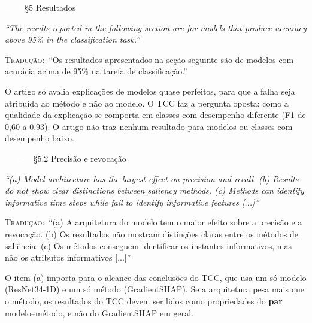 \documentclass[11pt,a4paper]{article}
\newcommand{\pagechip}[1]{{\setlength{\fboxsep}{1.5pt}\colorbox{cAcc}{\textcolor{white}{\scriptsize\texttt{#1}}}}}
\newenvironment{origquote}{\par\itshape\small}{\par}
\newenvironment{tradquote}{\par\small\textsc{Tradução:}\ }{\par}
\newcommand{\explab}[1]{\par\smallskip{\small\color{cAcc}\textbf{\MakeUppercase{#1}}}\par}
\begin{document}
\begin{citacard}{\pagechip{p. 5} §5 Resultados}
\begin{origquote}“The results reported in the following section are for models that produce accuracy above 95\% in the classification task.”\end{origquote}
\begin{tradquote}“Os resultados apresentados na seção seguinte são de modelos com acurácia acima de 95\% na tarefa de classificação.”\end{tradquote}
\explab{Explicação}
O artigo só avalia explicações de modelos quase perfeitos, para que a falha seja atribuída ao método e não ao modelo. O TCC faz a pergunta oposta: como a qualidade da explicação se comporta em classes com desempenho diferente (F1 de 0,60 a 0,93). O artigo não traz nenhum resultado para modelos ou classes com desempenho baixo.
\end{citacard}

\begin{citacard}{\pagechip{p. 6--7} §5.2 Precisão e revocação}
\begin{origquote}“(a) Model architecture has the largest effect on precision and recall. (b) Results do not show clear distinctions between saliency methods. (c) Methods can identify informative time steps while fail to identify informative features [...]”\end{origquote}
\begin{tradquote}“(a) A arquitetura do modelo tem o maior efeito sobre a precisão e a revocação. (b) Os resultados não mostram distinções claras entre os métodos de saliência. (c) Os métodos conseguem identificar os instantes informativos, mas não os atributos informativos [...]”\end{tradquote}
\explab{Explicação}
O item (a) importa para o alcance das conclusões do TCC, que usa um só modelo (ResNet34-1D) e um só método (GradientSHAP). Se a arquitetura pesa mais que o método, os resultados do TCC devem ser lidos como propriedades do \textbf{par} modelo--método, e não do GradientSHAP em geral.
\end{citacard}
\end{document}
